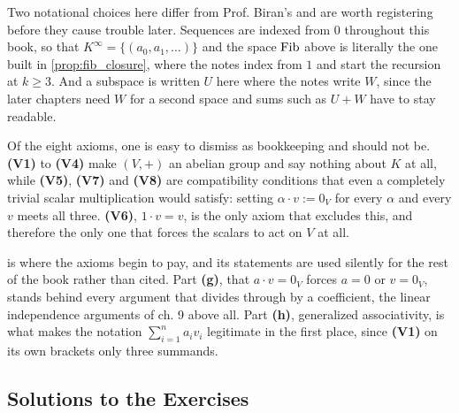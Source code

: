 \begin{ainote}
Two notational choices here differ from Prof. Biran's and are worth registering
before they cause trouble later. Sequences are indexed from $0$ throughout this
book, so that $K^\infty = \{(a_0, a_1, \dots)\}$ and the space $\operatorname{Fib}$ above is
literally the one built in \cref{prop:fib_closure}, where the notes index from
$1$ and start the recursion at $k \ge 3$. And a subspace is written $U$ here
where the notes write $W$, since the later chapters need $W$ for a second space
and sums such as $U + W$ have to stay readable.

Of the eight axioms, one is easy to dismiss as bookkeeping and should not be.
\textbf{(V1)} to \textbf{(V4)} make $(V, +)$ an abelian group and say nothing
about $K$ at all, while \textbf{(V5)}, \textbf{(V7)} and \textbf{(V8)} are
compatibility conditions that even a completely trivial scalar multiplication
would satisfy: setting $\alpha \cdot v := 0_V$ for every $\alpha$ and every $v$
meets all three. \textbf{(V6)}, $1 \cdot v = v$, is the only axiom that
excludes this, and therefore the only one that forces the scalars to act on $V$
at all.

 is where the axioms begin to pay, and its
statements are used silently for the rest of the book rather than cited. Part
\textbf{(g)}, that $a \cdot v = 0_V$ forces $a = 0$ or $v = 0_V$, stands behind
every argument that divides through by a coefficient, the linear independence
arguments of ch. 9 above all. Part \textbf{(h)}, generalized associativity, is
what makes the notation $\sum_{i=1}^n a_i v_i$ legitimate in the first place,
since \textbf{(V1)} on its own brackets only three summands.
\end{ainote}

\subsection{Solutions to the Exercises}
\label{sec:solutions_vector_spaces}

